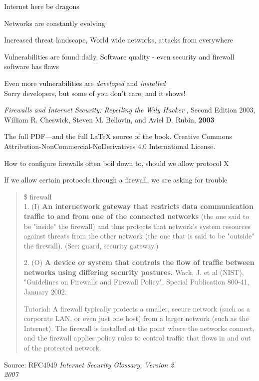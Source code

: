 \documentclass[Screen16to9,17pt]{foils}
\begin{document}

\centerline{\Large Internet here be dragons}

\begin{list2}
\item Networks are constantly evolving
\item Increased threat landscape, World wide networks, attacks from everywhere
\item Vulnerabilities are found daily, Software quality - even security and firewall software has flaws
\item Even more vulnerabilities are \emph{developed} and \emph{installed}\\
Sorry developers, but some of you don't care, and it shows!
\end{list2}



\begin{list2}
\item \emph{Firewalls and Internet Security: Repelling the Wily Hacker} , Second Edition 2003, William R. Cheswick, Steven M. Bellovin, and Aviel D. Rubin, {\bf 2003} 
\item The full PDF—and the full LaTeX source of the book.
Creative Commons Attribution-NonCommercial-NoDerivatives 4.0 International License.
\item How to configure firewalls often boil down to, should we allow protocol X
\item If we allow certain protocols through a firewall, we are asking for trouble
\end{list2}



\begin{quote}\small
\$ firewall\\

1. (I) {\bf An internetwork gateway that restricts data communication traffic to and from one of the connected networks} (the one said to be "inside" the firewall) and thus protects that network's system resources against threats from the other network (the one that is said to be "outside" the firewall). (See: guard, security gateway.)

2. (O) {\bf A device or system that controls the flow of traffic between networks using differing security postures.} Wack, J. et al (NIST), "Guidelines on Firewalls and Firewall Policy", Special Publication 800-41, January 2002.

Tutorial: A firewall typically protects a smaller, secure network (such as a corporate LAN, or even just one host) from a larger network (such as the Internet). The firewall is installed at the point where the networks connect, and the firewall applies policy rules to control traffic that flows in and out of the protected network.
\end{quote}
Source: RFC4949 \emph{Internet Security Glossary, Version 2\\
 2007}
\end{document}

